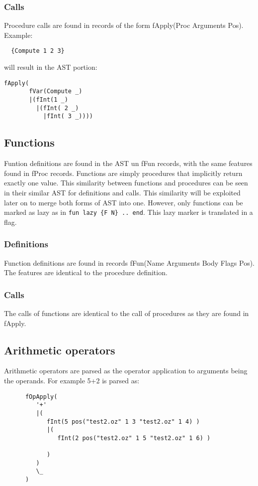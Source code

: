 \documentclass[a4paper]{memoir}
\begin{document}
\subsubsection{Calls}
Procedure calls are found in records of the form fApply(Proc Arguments Pos). 
Example:

\begin{lstlisting}
  {Compute 1 2 3}
\end{lstlisting}

will result in the AST portion:
\begin{verbatim}
fApply(
       fVar(Compute _)
       |(fInt(1 _)
         |(fInt( 2 _)
           |fInt( 3 _))))
\end{verbatim}

\subsection{Functions}                                                         
Funtion definitions are found in the AST un fFun records, with the same features found in fProc records. Functions are simply procedures that implicitly return exactly one value. This similarity between functions and procedures can be seen in their similar AST for definitions and calls. This similarity will be exploited later on to merge both forms of AST into one.
However, only functions can be marked as lazy as in \lstinline!fun lazy {F N} .. end!. This lazy marker is translated in a flag.
\subsubsection{Definitions}
Function definitions are found in records fFun(Name Arguments Body Flags Pos). The features are identical to the procedure definition.
\subsubsection{Calls}
The calls of functions are identical to the call of procedures as they are found in fApply.
\subsection{Arithmetic operators}
Arithmetic operators are parsed as the operator application to arguments being the operands. For example
5+2 is parsed as:
\begin{lstlisting}
      fOpApply(
         '+'
         |(
            fInt(5 pos("test2.oz" 1 3 "test2.oz" 1 4) )
            |(
               fInt(2 pos("test2.oz" 1 5 "test2.oz" 1 6) )
               
            )
         )
         \_
      )

\end{lstlisting}
\end{document}

